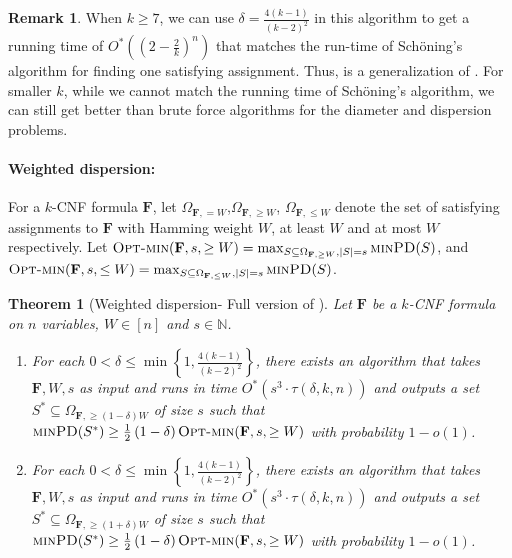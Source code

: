 \documentclass[11pt, letterpaper]{article}
\newtheorem{theorem}{Theorem}
\theoremstyle{definition}
\newtheorem{remark}{Remark}
\newcommand{\f}{\mathbf{F}}
\newcommand{\PD}{\textsc{minPD}}
\newcommand{\optm}{\textsc{Opt-min}}
\newcommand{\sch}{Sch\"{o}ning\xspace}
\newcommand{\IN}{\ensuremath{\mathbb{N}}}
\begin{document}
\begin{remark}\label{rem:sch:2}
    When $k \geq 7$, we can use $\delta=\frac{4(k-1)}{(k-2)^2}$ in this algorithm to get a running time of $O^*\left(\left( 2 - \frac{2}{k} \right)^n\right)$ that matches the run-time of \sch's algorithm for finding one satisfying assignment. Thus,  is a generalization of . For smaller $k$, while we cannot match the running time of \sch's algorithm, we can still get better than brute force algorithms for the diameter and dispersion problems. 
\end{remark}




\paragraph{Weighted dispersion:} For a $k$-CNF formula $\f$, let $\Omega_{\f,= W}$,$\Omega_{\f,\geq W}$, $\Omega_{\f,\leq W}$ denote the set of satisfying assignments to $\f$ with Hamming weight $W$, at least $W$ and at most $W$ respectively. Let $\optm(\f,s,\geq W)=\max_{S \subseteq \Omega_{\f,\geq W}, |S|=s} \PD(S)$, and \\ $\optm(\f,s,\leq W)=\max_{S \subseteq \Omega_{\f,\leq W}, |S|=s} \PD(S)$.

\begin{theorem}[Weighted dispersion- Full version of ] \label{thm:sch-heavy-full}
    Let $\f$ be a $k$-CNF formula on $n$ variables, $W \in [n]$ and $s \in \IN$. 
    \begin{enumerate}

        \item For each $0 < \delta \leq \min \left \{1, \frac{4(k-1)}{(k-2)^2} \right \}$, there exists an algorithm that takes $\f,W,s$ as input and runs in time $O^*\left(s^3 \cdot \tau(\delta, k, n)\right)$ and outputs a set $S^* \subseteq \Omega_{\f, \geq (1-\delta) W}$ of size $s$ such that $\PD(S^*) \geq \frac{1}{2}\left(1-\delta \right) \optm(\f,s, \geq W)$ with probability $1-o(1)$.

        \item For each $0 < \delta \leq \min \left \{1, \frac{4(k-1)}{(k-2)^2} \right \}$, there exists an algorithm that takes $\f,W,s$ as input and runs in time $O^*\left(s^3 \cdot \tau(\delta, k, n)\right)$ and outputs a set $S^* \subseteq \Omega_{\f, \geq (1+\delta) W}$ of size $s$ such that $\PD(S^*) \geq \frac{1}{2}\left(1-\delta \right) \optm(\f,s, \geq W)$ with probability $1-o(1)$.
     
         
    \end{enumerate}
    
\end{theorem}
\end{document}
